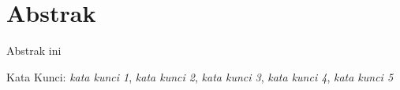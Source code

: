 
\chapter*{Abstrak}
\vspace*{0.7cm}

\noindent Abstrak ini\\


\vspace*{0.2cm}

\noindent Kata Kunci: \textit{kata kunci 1}, \textit{kata kunci 2}, \textit{kata kunci 3}, \textit{kata kunci 4}, \textit{kata kunci 5}\\ 

\newpage